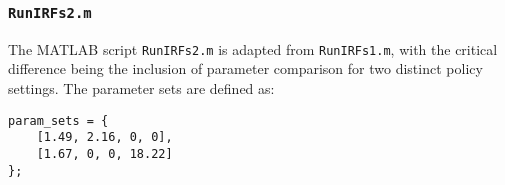 \documentclass[12pt]{article}
\begin{document}
\subsubsection{\texttt{RunIRFs2.m}}

The MATLAB script \texttt{RunIRFs2.m} is adapted from \texttt{RunIRFs1.m}, with the critical difference being the inclusion of parameter comparison for two distinct policy settings. The parameter sets are defined as:
\begin{verbatim}
param_sets = {
    [1.49, 2.16, 0, 0],
    [1.67, 0, 0, 18.22]
};
\end{verbatim}
\end{document}
